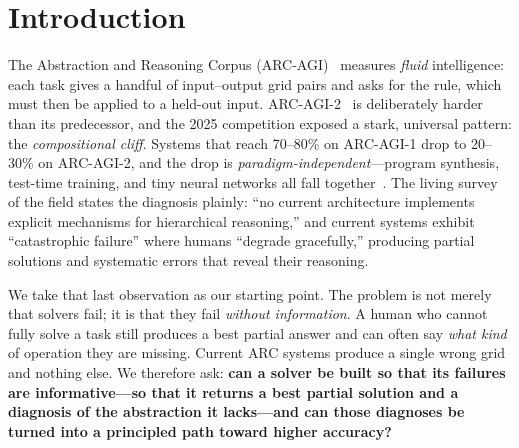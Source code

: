 \documentclass[11pt]{article}
\begin{document}
\section{Introduction}
The Abstraction and Reasoning Corpus (ARC-AGI)~\cite{chollet2019measure} measures \emph{fluid} intelligence:
each task gives a handful of input--output grid pairs and asks for the rule, which must then be applied to a
held-out input. ARC-AGI-2~\cite{chollet2025arc2} is deliberately harder than its predecessor, and the 2025
competition exposed a stark, universal pattern: the \emph{compositional cliff}. Systems that reach 70--80\% on
ARC-AGI-1 drop to 20--30\% on ARC-AGI-2, and the drop is \emph{paradigm-independent}---program synthesis,
test-time training, and tiny neural networks all fall together~\cite{survey2026arc,arcprize2025techreport}.
The living survey of the field states the diagnosis plainly: ``no current architecture implements explicit
mechanisms for hierarchical reasoning,'' and current systems exhibit ``catastrophic failure'' where humans
``degrade gracefully,'' producing partial solutions and systematic errors that reveal their reasoning.

We take that last observation as our starting point. The problem is not merely that solvers fail; it is that
they fail \emph{without information}. A human who cannot fully solve a task still produces a best partial
answer and can often say \emph{what kind} of operation they are missing. Current ARC systems produce a single
wrong grid and nothing else. We therefore ask: \textbf{can a solver be built so that its failures are
informative---so that it returns a best partial solution and a diagnosis of the abstraction it lacks---and can
those diagnoses be turned into a principled path toward higher accuracy?}
\end{document}
